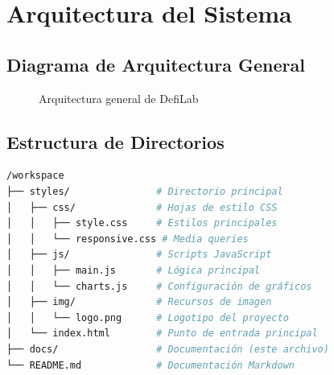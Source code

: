 \documentclass[a4paper,12pt]{article}
\begin{document}
\section{Arquitectura del Sistema}

\subsection{Diagrama de Arquitectura General}
\begin{figure}[H]
    \centering
    \caption{Arquitectura general de DefiLab}
    \label{fig:arquitectura}
\end{figure}

\subsection{Estructura de Directorios}
\begin{lstlisting}[language=bash, caption=Estructura del proyecto]
/workspace
├── styles/               # Directorio principal
│   ├── css/              # Hojas de estilo CSS
│   │   ├── style.css     # Estilos principales
│   │   └── responsive.css # Media queries
│   ├── js/               # Scripts JavaScript
│   │   ├── main.js       # Lógica principal
│   │   └── charts.js     # Configuración de gráficos
│   ├── img/              # Recursos de imagen
│   │   └── logo.png      # Logotipo del proyecto
│   └── index.html        # Punto de entrada principal
├── docs/                 # Documentación (este archivo)
└── README.md             # Documentación Markdown
\end{lstlisting}
\end{document}
